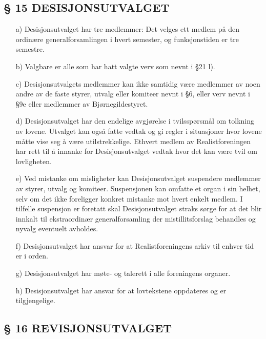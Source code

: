 \subsection*{§ 15 DESISJONSUTVALGET}

\begin{itemize}
\item[a)] Desisjonsutvalget har tre medlemmer: Det velges ett medlem på den
ordinære generalforsamlingen i hvert semester, og funksjonstiden er
tre semestre.

\item[b)] Valgbare er alle som har hatt valgte verv som nevnt i §21 l).

\item[c)] Desisjonsutvalgets medlemmer kan ikke samtidig være medlemmer av
noen andre av de faste styrer, utvalg eller komiteer nevnt i §6, eller
verv nevnt i §9e eller medlemmer av Bjørnegildestyret.

\item[d)] Desisjonsutvalget har den endelige avgjørelse i tvilsspørsmål om
tolkning av lovene. Utvalget kan også fatte vedtak og gi regler i
situasjoner hvor lovene måtte vise seg å være utilstrekkelige. Ethvert
medlem av Realistforeningen har rett til å innanke for
Desisjonsutvalget vedtak hvor det kan være tvil om lovligheten.

\item[e)] Ved mistanke om misligheter kan Desisjonsutvalget suspendere
medlemmer av styrer, utvalg og komiteer. Suspensjonen kan omfatte et
organ i sin helhet, selv om det ikke foreligger konkret mistanke mot
hvert enkelt medlem.  I tilfelle suspensjon er foretatt skal
Desisjonsutvalget straks sørge for at det blir innkalt til
ekstraordinær generalforsamling der mistillitsforslag behandles og
nyvalg eventuelt avholdes.

\item[f)] Desisjonsutvalget har ansvar for at Realistforeningens arkiv til
enhver tid er i orden.
        
\item[g)] Desisjonsutvalget har møte- og talerett i alle foreningens organer. 

\item[h)] Desisjonsutvalget har ansvar for at lovtekstene oppdateres og er tilgjengelige.
\end{itemize}


\subsection*{§ 16 REVISJONSUTVALGET}

